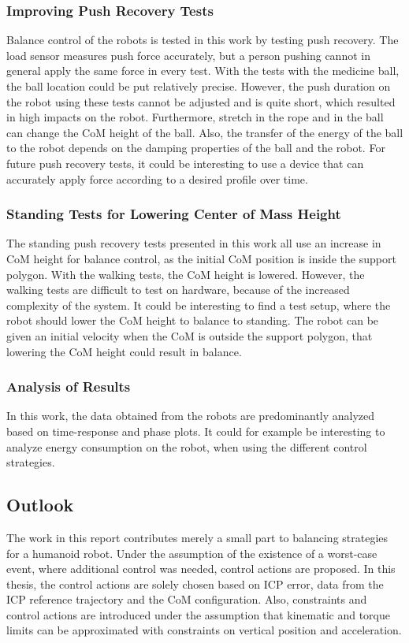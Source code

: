 \subsubsection{Improving Push Recovery Tests}
Balance control of the robots is tested in this work by testing push recovery. The load sensor measures push force accurately, but a person pushing cannot in general apply the same force in every test. With the tests with the medicine ball, the ball location could be put relatively precise. However, the push duration on the robot using these tests cannot be adjusted and is quite short, which resulted in high impacts on the robot. Furthermore, stretch in the rope and in the ball can change the \ac{CoM} height of the ball. Also, the transfer of the energy of the ball to the robot depends on the damping properties of the ball and the robot. For future push recovery tests, it could be interesting to use a device that can accurately apply force according to a desired profile over time.
\subsubsection{Standing Tests for Lowering Center of Mass Height}
The standing push recovery tests presented in this work all use an increase in \ac{CoM} height for balance control, as the initial \ac{CoM} position is inside the support polygon. With the walking tests, the \ac{CoM} height is lowered. However, the walking tests are difficult to test on hardware, because of the increased complexity of the system. It could be interesting to find a test setup, where the robot should lower the \ac{CoM} height to balance to standing. The robot can be given an initial velocity when the \ac{CoM} is outside the support polygon, that lowering the \ac{CoM} height could result in balance.
\subsubsection{Analysis of Results}
In this work, the data obtained from the robots are predominantly analyzed based on time-response and phase plots. It could for example be interesting to analyze energy consumption on the robot, when using the different control strategies. 

\subsection{Outlook}
The work in this report contributes merely a small part to balancing strategies for a humanoid robot. Under the assumption of the existence of a worst-case event, where additional control was needed, control actions are proposed. In this thesis, the control actions are solely chosen based on \ac{ICP} error, data from the \ac{ICP} reference trajectory and the \ac{CoM} configuration. Also, constraints and control actions are introduced under the assumption that kinematic and torque limits can be approximated with constraints on vertical position and acceleration. 

